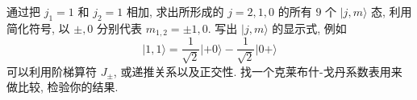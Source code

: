 \documentclass{assignment}
\begin{document}
\begin{prob}[课本习题 3.24]
    通过把 $j_1=1$ 和 $j_2=1$ 相加, 求出所形成的 $j=2,1,0$ 的所有 $9$ 个 $\lvert j,m\rangle$ 态, 利用简化符号, 以 $\pm,0$ 分别代表 $m_{1,2}=\pm 1,0$. 写出 $\lvert j,m\rangle$ 的显示式, 例如
    \[
        \lvert 1,1\rangle=\frac{1}{\sqrt{2}}\lvert+0\rangle-\frac{1}{\sqrt{2}}\lvert 0+\rangle
    \]
    可以利用阶梯算符 $J_{\pm}$, 或递推关系以及正交性. 找一个克莱布什-戈丹系数表用来做比较, 检验你的结果.
\end{prob}
\begin{sol}
    
\end{sol}
\end{document}
